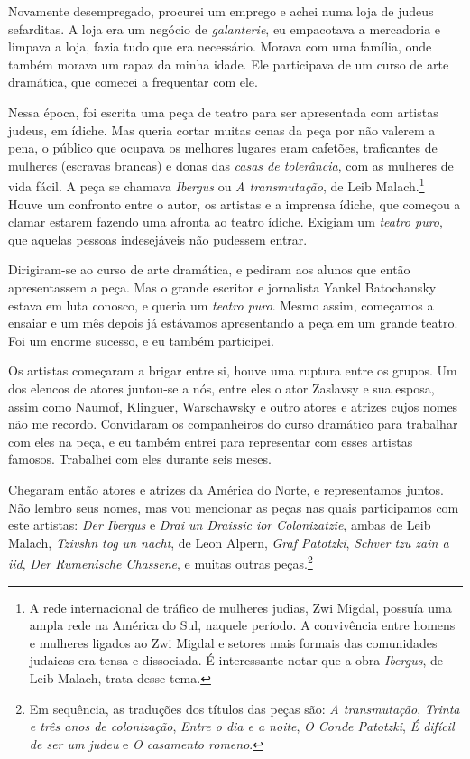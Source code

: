 Novamente desempregado, procurei um emprego e achei numa loja de judeus
sefarditas. A loja era um negócio de \textit{galanterie}, eu empacotava a
mercadoria e limpava a loja, fazia tudo que era necessário. Morava com
uma família, onde também morava um rapaz da minha idade. Ele
participava de um curso de arte dramática, que comecei a frequentar com ele.

Nessa época, foi escrita uma peça de teatro para ser apresentada 
com artistas judeus, em ídiche. Mas
queria cortar muitas cenas da peça por não valerem a pena, o
público que ocupava os melhores lugares eram cafetões,
traficantes de mulheres (escravas brancas) e donas das \textit{casas de
tolerância}, com as mulheres de vida fácil. A peça se chamava
\textit{Ibergus} ou \textit{A transmutação}, de Leib Malach.\footnote{A rede
  internacional de tráfico de mulheres judias, Zwi Migdal, possuía uma
  ampla rede na América do Sul, naquele período. A convivência entre
  homens e mulheres ligados ao Zwi Migdal e setores mais formais das
  comunidades judaicas era tensa e dissociada. É interessante notar que
  a obra \textit{Ibergus}, de Leib Malach, trata desse tema.} Houve um confronto
entre o autor, os artistas e a imprensa ídiche, que começou a clamar
estarem fazendo uma afronta ao teatro ídiche. Exigiam um \textit{teatro puro}, que aquelas pessoas indesejáveis não pudessem entrar.

Dirigiram-se ao curso de arte dramática, e pediram aos alunos que 
então apresentassem a peça. Mas o grande escritor e jornalista Yankel
Batochansky estava em luta conosco, e queria um \textit{teatro puro}. Mesmo assim, 
começamos a ensaiar e um mês depois já estávamos apresentando a peça
em um grande teatro. Foi um enorme sucesso, e eu também participei.

Os artistas começaram a brigar entre si, houve uma ruptura entre os grupos. Um dos 
elencos de atores juntou-se a nós, entre eles o ator Zaslavsy e sua esposa, assim como Naumof, Klinguer,
Warschawsky e outro atores e atrizes cujos nomes não me recordo.
Convidaram os companheiros do curso dramático para trabalhar com eles na
peça, e eu também entrei para representar com esses artistas famosos. Trabalhei com eles durante seis meses.

Chegaram então atores e atrizes da América do Norte, e
representamos juntos. Não lembro seus nomes, mas vou mencionar as peças nas
quais participamos com este artistas: \textit{Der Ibergus} e \textit{Drai un Draissic ior Colonizatzie}, ambas de Leib Malach, \textit{Tzivshn tog un nacht}, de Leon Alpern, \textit{Graf Patotzki}, \textit{Schver tzu zain a iid}, \textit{Der Rumenische Chassene}, e
muitas outras peças.\footnote{Em sequência, as traduções dos títulos das peças são: \textit{A transmutação}, \textit{Trinta e três anos de colonização}, \textit{Entre o dia e a noite}, \textit{O Conde Patotzki}, \textit{É difícil de ser um judeu} e \textit{O casamento romeno}.}


